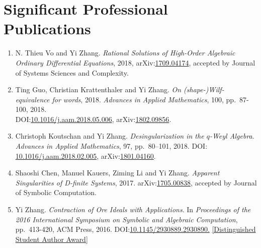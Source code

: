 \documentclass[a4paper,12pt]{article}
\begin{document}
\section*{\Large{Significant Professional Publications}}
\begin{enumerate}
 \item N. Thieu Vo and Yi Zhang. {\em Rational Solutions of High-Order Algebraic Ordinary Differential Equations}, 2018, 
 arXiv:\href{https://arxiv.org/abs/1709.04174}{1709.04174}, accepted by Journal of Systems Sciences and Complexity.
\item Ting Guo, Christian Krattenthaler and Yi Zhang.
{\em On (shape-)Wilf-equivalence for words}, 2018.
{\em  Advances in Applied Mathematics}, 100, pp.\ 87-100, 2018. \\
DOI:\href{https://doi.org/10.1016/j.aam.2018.05.006}{10.1016/j.aam.2018.05.006}, 
arXiv:\href{https://arxiv.org/pdf/1802.09856.pdf}{1802.09856}.
\item Christoph Koutschan and Yi Zhang. {\em Desingularization in the $q$-Weyl Algebra}. 
{\em Advances in Applied Mathematics}, 97, pp.\ 80–101, 2018. 
DOI: \href{http://dx.doi.org/10.1016/j.aam.2018.02.005}{10.1016/j.aam.2018.02.005},
arXiv:\href{https://arxiv.org/abs/1801.04160}{1801.04160}.   
\item Shaoshi Chen, Manuel Kauers, Ziming Li and Yi Zhang. {\em Apparent Singularities of D-finite Systems}, 2017. 
 arXiv:\href{http://arxiv.org/abs/1705.00838}{1705.00838}, accepted by Journal of Symbolic Computation.
\item Yi Zhang. {\em Contraction of Ore Ideals with Applications}. 
In {\em Proceedings of the 2016 International Symposium on Symbolic and Algebraic Computation}, 
pp.\ 413-420, ACM Press, 2016. DOI:\href{http://dl.acm.org/citation.cfm?id=2930890}{10.1145/2930889.2930890.} 
\href{https://www.sigsam.org/Awards/ISSACAwards.html}{[Distinguished Student Author Award]}
\end{enumerate}
\end{document}

